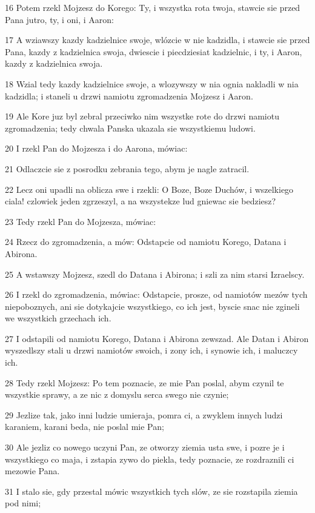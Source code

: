 \par 16 Potem rzekl Mojzesz do Korego: Ty, i wszystka rota twoja, stawcie sie przed Pana jutro, ty, i oni, i Aaron:
\par 17 A wziawszy kazdy kadzielnice swoje, wlózcie w nie kadzidla, i stawcie sie przed Pana, kazdy z kadzielnica swoja, dwiescie i piecdziesiat kadzielnic, i ty, i Aaron, kazdy z kadzielnica swoja.
\par 18 Wzial tedy kazdy kadzielnice swoje, a wlozywszy w nia ognia nakladli w nia kadzidla; i staneli u drzwi namiotu zgromadzenia Mojzesz i Aaron.
\par 19 Ale Kore juz byl zebral przeciwko nim wszystke rote do drzwi namiotu zgromadzenia; tedy chwala Panska ukazala sie wszystkiemu ludowi.
\par 20 I rzekl Pan do Mojzesza i do Aarona, mówiac:
\par 21 Odlaczcie sie z posrodku zebrania tego, abym je nagle zatracil.
\par 22 Lecz oni upadli na oblicza swe i rzekli: O Boze, Boze Duchów, i wszelkiego ciala! czlowiek jeden zgrzeszyl, a na wszystekze lud gniewac sie bedziesz?
\par 23 Tedy rzekl Pan do Mojzesza, mówiac:
\par 24 Rzecz do zgromadzenia, a mów: Odstapcie od namiotu Korego, Datana i Abirona.
\par 25 A wstawszy Mojzesz, szedl do Datana i Abirona; i szli za nim starsi Izraelscy.
\par 26 I rzekl do zgromadzenia, mówiac: Odstapcie, prosze, od namiotów mezów tych niepoboznych, ani sie dotykajcie wszystkiego, co ich jest, byscie snac nie zgineli we wszystkich grzechach ich.
\par 27 I odstapili od namiotu Korego, Datana i Abirona zewszad. Ale Datan i Abiron wyszedlszy stali u drzwi namiotów swoich, i zony ich, i synowie ich, i maluczcy ich.
\par 28 Tedy rzekl Mojzesz: Po tem poznacie, ze mie Pan poslal, abym czynil te wszystkie sprawy, a ze nic z domyslu serca swego nie czynie;
\par 29 Jezlize tak, jako inni ludzie umieraja, pomra ci, a zwyklem innych ludzi karaniem, karani beda, nie poslal mie Pan;
\par 30 Ale jezliz co nowego uczyni Pan, ze otworzy ziemia usta swe, i pozre je i wszystkiego co maja, i zstapia zywo do piekla, tedy poznacie, ze rozdraznili ci mezowie Pana.
\par 31 I stalo sie, gdy przestal mówic wszystkich tych slów, ze sie rozstapila ziemia pod nimi;
